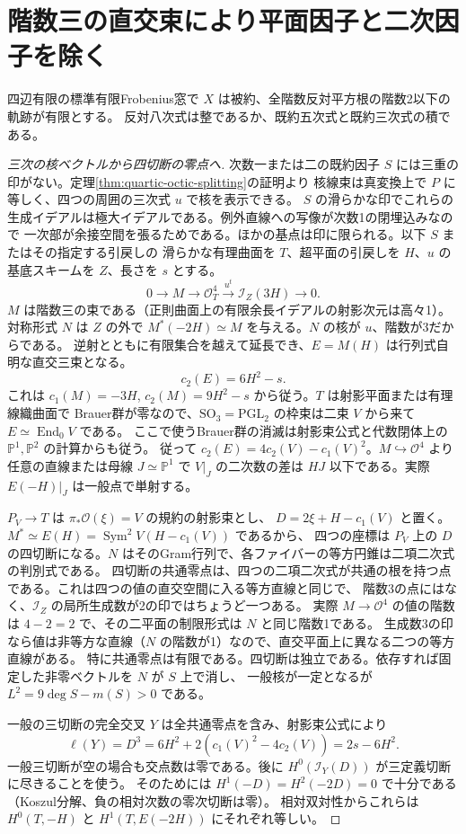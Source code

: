 \section{階数三の直交束により平面因子と二次因子を除く}
\label{sec:low-degree-octic-spinor}
\begin{theorem}\label{thm:low-degree-octic-spinor}
四辺有限の標準有限Frobenius窓で $X$ は被約、全階数反対平方根の階数2以下の軌跡が有限とする。
反対八次式は整であるか、既約五次式と既約三次式の積である。
\end{theorem}
\begin{proof}[三次の核ベクトルから四切断の零点へ]
次数一または二の既約因子 $S$ には三重の印がない。定理\ref{thm:quartic-octic-splitting}の証明より
核線束は真変換上で $P$ に等しく、四つの周囲の三次式 $u$ で核を表示できる。
$S$ の滑らかな印でこれらの生成イデアルは極大イデアルである。例外直線への写像が次数1の閉埋込みなので
一次部が余接空間を張るためである。ほかの基点は印に限られる。以下 $S$ またはその指定する引戻しの
滑らかな有理曲面を $T$、超平面の引戻しを $H$、$u$ の基底スキームを $Z$、長さを $s$ とする。
\[
 0\longrightarrow M\longrightarrow\mathcal O_T^4\xrightarrow{u^t}\mathcal I_Z(3H)\longrightarrow0 .
\]
$M$ は階数三の束である（正則曲面上の有限余長イデアルの射影次元は高々1）。
対称形式 $N$ は $Z$ の外で $M^*(-2H)\simeq M$ を与える。$N$ の核が $u$、階数が3だからである。
逆射とともに有限集合を越えて延長でき、$E=M(H)$ は行列式自明な直交三束となる。
\[
                       c_2(E)=6H^2-s .
\]
これは $c_1(M)=-3H$, $c_2(M)=9H^2-s$ から従う。$T$ は射影平面または有理線織曲面で
Brauer群が零なので、$\mathrm{SO}_3=\mathrm{PGL}_2$ の枠束は二束 $V$ から来て $E\simeq\operatorname{End}_0 V$ である。
ここで使うBrauer群の消滅は射影束公式と代数閉体上の $\mathbb P^1,\mathbb P^2$ の計算からも従う。
従って $c_2(E)=4c_2(V)-c_1(V)^2$。$M\hookrightarrow\mathcal O^4$ より任意の直線または母線
$J\simeq\mathbb P^1$ で $V|_J$ の二次数の差は $H J$ 以下である。実際 $E(-H)|_J$ は一般点で単射する。

$P_V\to T$ は $\pi_*\mathcal O(\xi)=V$ の規約の射影束とし、
$D=2\xi+H-c_1(V)$ と置く。$M^*\simeq E(H)=\operatorname{Sym}^2 V(H-c_1(V))$ であるから、
四つの座標は $P_V$ 上の $D$ の四切断になる。$N$ はそのGram行列で、各ファイバーの等方円錐は二項二次式の判別式である。
四切断の共通零点は、四つの二項二次式が共通の根を持つ点である。これは四つの値の直交空間に入る等方直線と同じで、
階数3の点にはなく、$\mathcal I_Z$ の局所生成数が2の印ではちょうど一つある。
実際 $M\to\mathcal O^4$ の値の階数は $4-2=2$ で、その二平面の制限形式は $N$ と同じ階数1である。
生成数3の印なら値は非等方な直線（$N$ の階数が1）なので、直交平面上に異なる二つの等方直線がある。
特に共通零点は有限である。四切断は独立である。依存すれば固定した非零ベクトルを $N$ が $S$ 上で消し、
一般核が一定となるが $L^2=9\deg S-m(S)>0$ である。

一般の三切断の完全交叉 $Y$ は全共通零点を含み、射影束公式により
\[
              \ell(Y)=D^3=6H^2+2(c_1(V)^2-4c_2(V))=2s-6H^2 .
\]
一般三切断が空の場合も交点数は零である。後に $H^0(\mathcal I_Y(D))$ が三定義切断に尽きることを使う。
そのためには $H^1(-D)=H^2(-2D)=0$ で十分である（Koszul分解、負の相対次数の零次切断は零）。
相対双対性からこれらは $H^0(T,-H)$ と $H^1(T,E(-2H))$ にそれぞれ等しい。
\end{proof}
